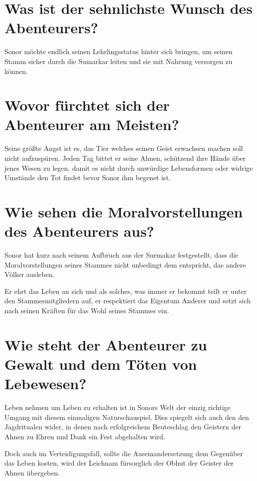 \documentclass{article}
\begin{document}
	\section[Antrieb]{Was ist der sehnlichste Wunsch des Abenteurers?}

	Sonor möchte endlich seinen Lehrlingsstatus hinter sich bringen, um
	seinen Stamm sicher durch die Sumarkar leiten und sie mit Nahrung
	versorgen zu können.

	
	\section[Ängste]{Wovor fürchtet sich der Abenteurer am Meisten?}

	Seine größte Angst ist es, das Tier welches seinen Geist erwachsen
	machen soll nicht aufzuspüren. Jeden Tag bittet er seine Ahnen,
	schützend ihre Hände über jenes Wesen zu legen, damit es nicht durch
	unwürdige Lebensformen oder widrige Umstände den Tot findet bevor Sonor
	ihm begenet ist.


	\section[Moral]{Wie sehen die Moralvorstellungen des Abenteurers aus?}
	

	Sonor hat kurz nach seinem Aufbruch aus der Surmakar festgestellt, dass
	die Moralvorstellungen seines Stammes nicht unbedingt dem entspricht,
	das andere Völker ausleben. 

	Er ehrt das Leben an sich und als solches, was immer er bekommt teilt er
	unter den Stammesmitgliedern auf, er respektiert das Eigentum Anderer
	und setzt sich nach seinen Kräften für das Wohl seines Stammes ein.


	\section[Frustrationstoleranz]{Wie steht der Abenteurer zu Gewalt und dem Töten von Lebewesen?}


	Leben nehmen um Leben zu erhalten ist in Sonors Welt der einzig richtige
	Umgang mit diesem einmaligen Naturschauspiel. Dies spiegelt sich auch
	den den Jagdritualen wider, in denen nach erfolgreichem Beuteschlag den
	Geistern der Ahnen zu Ehren und Dank ein Fest abgehalten wird.

	Doch auch im Verteidigungsfall, sollte die Auseinandersetzung dem
	Gegenüber das Leben kosten, wird der Leichnam fürsorglich der Obhut der
	Geister der Ahnen übergeben.
\end{document}
